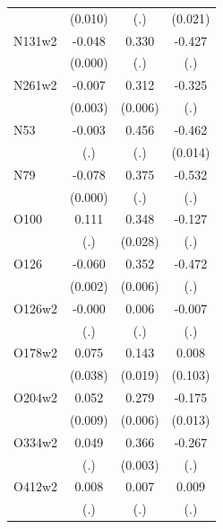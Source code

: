 \begin{table}[htbp]
\begin{tabular}{l*{3}{c}}
                &  (0.010)         &      (.)         &  (0.021)         \\
N131w2          &   -0.048\sym{***}&    0.330         &   -0.427         \\
                &  (0.000)         &      (.)         &      (.)         \\
N261w2          &   -0.007\sym{**} &    0.312\sym{***}&   -0.325         \\
                &  (0.003)         &  (0.006)         &      (.)         \\
N53             &   -0.003         &    0.456         &   -0.462\sym{***}\\
                &      (.)         &      (.)         &  (0.014)         \\
N79             &   -0.078\sym{***}&    0.375         &   -0.532         \\
                &  (0.000)         &      (.)         &      (.)         \\
O100            &    0.111         &    0.348\sym{***}&   -0.127         \\
                &      (.)         &  (0.028)         &      (.)         \\
O126            &   -0.060\sym{***}&    0.352\sym{***}&   -0.472         \\
                &  (0.002)         &  (0.006)         &      (.)         \\
O126w2          &   -0.000         &    0.006         &   -0.007         \\
                &      (.)         &      (.)         &      (.)         \\
O178w2          &    0.075\sym{**} &    0.143\sym{***}&    0.008         \\
                &  (0.038)         &  (0.019)         &  (0.103)         \\
O204w2          &    0.052\sym{***}&    0.279\sym{***}&   -0.175\sym{***}\\
                &  (0.009)         &  (0.006)         &  (0.013)         \\
O334w2          &    0.049         &    0.366\sym{***}&   -0.267         \\
                &      (.)         &  (0.003)         &      (.)         \\
O412w2          &    0.008         &    0.007         &    0.009         \\
                &      (.)         &      (.)         &      (.)         \\

\end{tabular}
\end{table}
